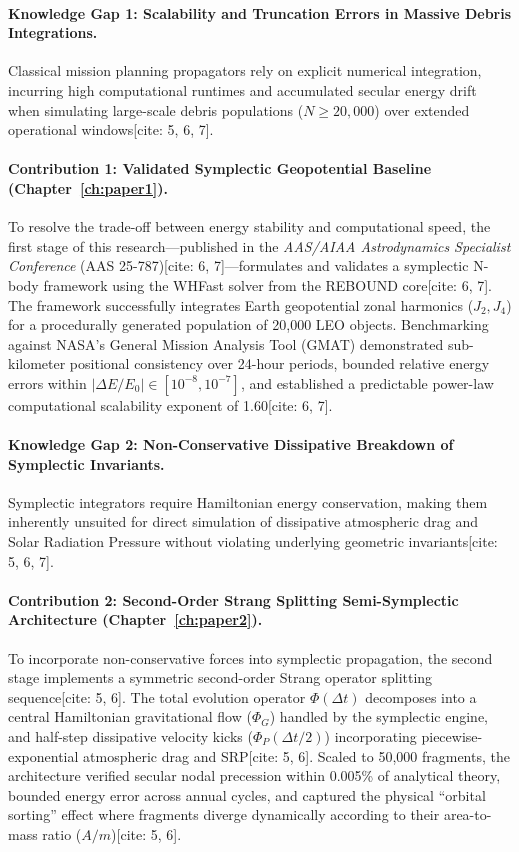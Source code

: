\documentclass[12pt,letterpaper,twoside]{book}
\begin{document}
\paragraph{Knowledge Gap 1: Scalability and Truncation Errors in Massive Debris Integrations.}
Classical mission planning propagators rely on explicit numerical integration, incurring high computational runtimes and accumulated secular energy drift when simulating large-scale debris populations ($N \ge 20,000$) over extended operational windows[cite: 5, 6, 7].

\paragraph{Contribution 1: Validated Symplectic Geopotential Baseline (Chapter~\ref{ch:paper1}).}
To resolve the trade-off between energy stability and computational speed, the first stage of this research—published in the \textit{AAS/AIAA Astrodynamics Specialist Conference} (AAS 25-787)[cite: 6, 7]—formulates and validates a symplectic N-body framework using the WHFast solver from the REBOUND core[cite: 6, 7]. The framework successfully integrates Earth geopotential zonal harmonics ($J_2, J_4$) for a procedurally generated population of 20,000 LEO objects. Benchmarking against NASA's General Mission Analysis Tool (GMAT) demonstrated sub-kilometer positional consistency over 24-hour periods, bounded relative energy errors within $|\Delta E/E_0| \in [10^{-8}, 10^{-7}]$, and established a predictable power-law computational scalability exponent of 1.60[cite: 6, 7].

\paragraph{Knowledge Gap 2: Non-Conservative Dissipative Breakdown of Symplectic Invariants.}
Symplectic integrators require Hamiltonian energy conservation, making them inherently unsuited for direct simulation of dissipative atmospheric drag and Solar Radiation Pressure without violating underlying geometric invariants[cite: 5, 6, 7].

\paragraph{Contribution 2: Second-Order Strang Splitting Semi-Symplectic Architecture (Chapter~\ref{ch:paper2}).}
To incorporate non-conservative forces into symplectic propagation, the second stage implements a symmetric second-order Strang operator splitting sequence[cite: 5, 6]. The total evolution operator $\Phi(\Delta t)$ decomposes into a central Hamiltonian gravitational flow ($\Phi_G$) handled by the symplectic engine, and half-step dissipative velocity kicks ($\Phi_P(\Delta t/2)$) incorporating piecewise-exponential atmospheric drag and SRP[cite: 5, 6]. Scaled to 50,000 fragments, the architecture verified secular nodal precession within 0.005\% of analytical theory, bounded energy error across annual cycles, and captured the physical ``orbital sorting'' effect where fragments diverge dynamically according to their area-to-mass ratio ($A/m$)[cite: 5, 6].
\end{document}
